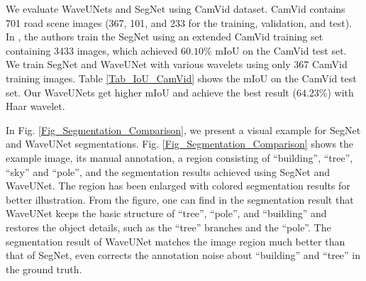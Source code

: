\documentclass[10pt,twocolumn,letterpaper]{article}
\begin{document}
We evaluate WaveUNets and SegNet using CamVid \cite{brostow2009semantic} dataset.
CamVid contains 701 road scene images (367, 101, and 233 for the training, validation, and test).
In \cite{badrinarayanan2017segnet}, the authors train the SegNet using an extended CamVid training set containing 3433 images,
which achieved $60.10\%$ mIoU on the CamVid test set.
We train SegNet and WaveUNet with various wavelets using only 367 CamVid training images.
Table \ref{Tab_IoU_CamVid} shows the mIoU on the CamVid test set.
Our WaveUNets get higher mIoU and achieve the best result ($64.23\%$) with Haar wavelet.

In Fig. \ref{Fig_Segmentation_Comparison}, we present a visual example for SegNet and WaveUNet segmentations.
Fig. \ref{Fig_Segmentation_Comparison} shows the example image, its manual annotation,
a region consisting of ``building'', ``tree'', ``sky'' and ``pole'', and the segmentation results achieved using SegNet and WaveUNet.
The region has been enlarged with colored segmentation results for better illustration.
From the figure, one can find in the segmentation result that WaveUNet keeps the basic structure of ``tree'', ``pole'', and ``building''
and restores the object details, such as the ``tree'' branches and the ``pole''.
The segmentation result of WaveUNet matches the image region much better than that of SegNet,
even corrects the annotation noise about ``building'' and ``tree'' in the ground truth.
\begin{table}[!t]
	\scriptsize
	\caption{Results on CamVid test set.}
	\label{Tab_IoU_CamVid}
	\begin{center}
	\begin{threeparttable}
	\end{threeparttable}
	\end{center}
\end{table}
\end{document}
